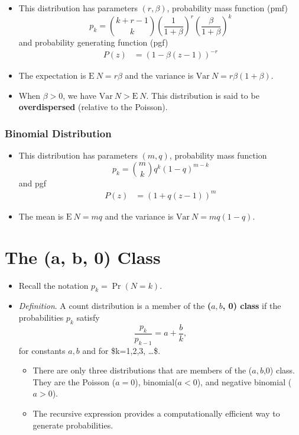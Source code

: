 \documentclass[]{book}
\theoremstyle{definition}
\theoremstyle{definition}
\theoremstyle{definition}
\theoremstyle{remark}
\begin{document}
\begin{itemize}
\item
  This distribution has parameters \((r, \beta)\), probability mass
  function (pmf)
  \[p_k = {k+r-1\choose k} \left(\frac{1}{1+\beta}\right)^r \left(\frac{\beta}{1+\beta}\right)^k\]
  and probability generating function (pgf) \[\begin{aligned}
  P(z) &= (1-\beta(z-1))^{-r} \end{aligned}\]
\item
  The expectation is \(\mathrm{E~}N = r\beta\) and the variance is
  \(\mathrm{Var~}N = r\beta(1+\beta)\).
\item
  When \(\beta>0\), we have \(\mathrm{Var~}N >\mathrm{E~}N\). This
  distribution is said to be \textbf{overdispersed} (relative to the
  Poisson).
\end{itemize}

\subsubsection{Binomial Distribution}\label{binomial-distribution}

\begin{itemize}
\item
  This distribution has parameters \((m,q)\), probability mass function
  \[p_k = {m\choose k} q^k (1-q)^{m-k}\] and pgf \[\begin{aligned}
  P(z) &= (1+q(z-1))^m\end{aligned}\]
\item
  The mean is \(\mathrm{E~}N = mq\) and the variance is
  \(\mathrm{Var~}N = mq(1-q)\).
\end{itemize}

\section{The (a, b, 0) Class}\label{the-a-b-0-class}

\begin{itemize}
\item
  Recall the notation \(p_k= \Pr(N = k)\).
\item
  \emph{Definition}. A count distribution is a member of the
  \textbf{(\(a, b\), 0) class} if the probabilities \(p_k\) satisfy
  \[\frac{p_k}{p_{k-1}}=a+\frac{b}{k},\] for constants \(a,b\) and for
  \$k=1,2,3, \ldots \$.

  \begin{itemize}
  \item
    There are only three distributions that are members of the
    (\(a,b\),0) class. They are the Poisson (\(a=0\)),
    binomial(\(a<0\)), and negative binomial (\(a>0\)).
  \item
    The recursive expression provides a computationally efficient way to
    generate probabilities.
  \end{itemize}
\end{itemize}
\end{document}
